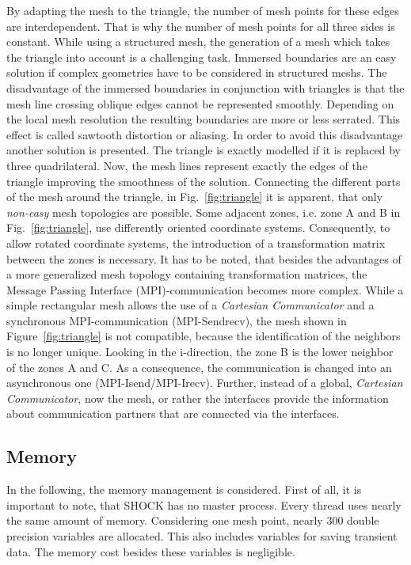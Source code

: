 By adapting the mesh to the triangle, the number of mesh points for these edges are interdependent.
That is why the number of mesh points for all three sides is constant.
While using a structured mesh, the generation of a mesh which takes the triangle into account is a challenging task.
Immersed boundaries are an easy solution if complex geometries have to be considered in structured meshs.
The disadvantage of the immersed boundaries in conjunction with triangles is that the mesh line crossing oblique edges cannot be represented smoothly.
Depending on the local mesh resolution the resulting boundaries are more or less serrated.
This effect is called sawtooth distortion or aliasing.
In order to avoid this disadvantage another solution is presented.
The triangle is exactly modelled if it is replaced by three quadrilateral.
Now, the mesh lines represent exactly the edges of the triangle improving the smoothness of the solution.
Connecting the different parts of the mesh around the triangle, in Fig.~\ref{fig:triangle} it is apparent, that only \textit{non-easy} mesh topologies are possible.
Some adjacent zones, i.e. zone A and B in Fig.~\ref{fig:triangle}, use differently oriented coordinate systems.
Consequently, to allow rotated coordinate systems, the introduction of a transformation matrix between the zones is necessary.
It has to be noted, that besides the advantages of a more generalized mesh topology containing transformation matrices, the Message Passing Interface (MPI)-communication becomes more complex.
While a simple rectangular mesh allows the use of a \textit{Cartesian Communicator} and a synchronous MPI-communication (MPI-Sendrecv), the mesh shown in Figure~\ref{fig:triangle} is not compatible, because the identification of the neighbors is no longer unique.
Looking in the i-direction, the zone B is the lower neighbor of the zones A and C.
As a consequence, the communication is changed into an asynchronous one (MPI-Isend/MPI-Irecv).
Further, instead of a global, \textit{Cartesian Communicator}, now the mesh, or rather the interfaces provide the information about communication partners that are connected via the interfaces.

\subsection{Memory}
In the following, the memory management is considered.
First of all, it is important to note, that SHOCK has no master process.
Every thread uses nearly the same amount of memory.
Considering one mesh point, nearly 300 double precision variables are allocated.
This also includes variables for saving transient data.
The memory cost besides these variables is negligible.

